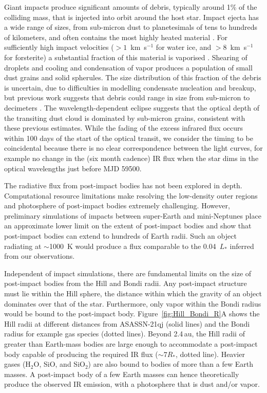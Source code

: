 \documentclass[sn-nature]{sn-jnl}%
\begin{document}
Giant impacts produce significant amounts of debris, typically around 1\% of the colliding mass, that is injected into orbit around the host star\cite{Canup2001,Lock18}.
%
Impact ejecta has a wide range of sizes, from sub-micron dust to planetesimals of tens to hundreds of kilometers, and often contains the most highly heated material \cite{Benz2008_Mercury_book,Leinhardt2015,Carter2020a}.
%
For sufficiently high impact velocities ($>1$~km~s$^{-1}$ for water ice, and $>8$~km~s$^{-1}$ for forsterite) a substantial fraction of this material is vaporised \cite{Stewart2008,Davies2020,Carter2020a}.
%
Shearing of droplets and cooling and condensation of vapor produces a population of small dust grains and solid spherules.
%
The size distribution of this fraction of the debris is uncertain, due to difficulties in modelling condensate nucleation and breakup, but previous work suggests that debris could range in size from sub-micron to decimeters \cite{Benz2008_Mercury_book,Johnson2015}.
%
The wavelength-dependent eclipse suggests that the optical depth of the transiting dust cloud is dominated by sub-micron grains, consistent with these previous estimates.
%
While the fading of the excess infrared flux occurs within 100 days of the start of the optical transit, we consider the timing to be coincidental because there is no clear correspondence between the light curves, for example no  change in the (six month cadence) IR flux when the star dims in the optical wavelengths just before MJD 59500.




The radiative flux from post-impact bodies has not been explored in depth.
%
Computational resource limitations make resolving the low-density outer regions and photosphere of post-impact bodies extremely challenging.
%
However, preliminary simulations of impacts between super-Earth and mini-Neptunes place an approximate lower limit on the extent of post-impact bodies and show that post-impact bodies can extend to hundreds of Earth radii.
%
Such an object radiating at $\sim$1000~K would produce a flux comparable to the 0.04~$L_*$ inferred from our observations. 

Independent of impact simulations, there are fundamental limits on the size of post-impact bodies from the Hill and Bondi radii.
%
Any post-impact structure must lie within the Hill sphere, the distance within which the gravity of an object dominates over that of the star.
%
Furthermore, only vapor within the Bondi radius would be bound to the post-impact body.
%
Figure~\ref{fig:Hill_Bondi_R}A shows the Hill radii at different distances from ASASSN-21qj (solid lines) and the Bondi radius for example gas species (dotted lines).
%
Beyond 2.4\,au, the Hill radii of greater than Earth-mass bodies are large enough to accommodate a post-impact body capable of producing the required IR flux ($\sim7R_*$, dotted line). 
%
Heavier gases (H$_2$O, SiO, and SiO$_2$) are also bound to bodies of more than a few Earth masses.
%
A post-impact body of a few Earth masses can hence theoretically produce the observed IR emission, with a photosphere that is dust and/or vapor.
\end{document}
